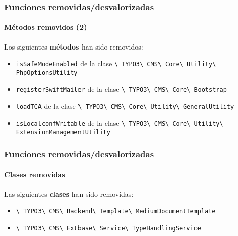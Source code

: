 \begin{frame}[fragile]
	\frametitle{Funciones removidas/desvalorizadas}
	\framesubtitle{Métodos removidos (2)}

	Los siguientes \textbf{métodos} han sido removidos:

	\begin{itemize}

		\item
			\small
				\texttt{isSafeModeEnabled}\newline
				de la clase
				\texttt{\textbackslash
					TYPO3\textbackslash
					CMS\textbackslash
					Core\textbackslash
					Utility\textbackslash
					PhpOptionsUtility}
			\normalsize
		\item
			\small
				\texttt{registerSwiftMailer}\newline
				de la clase
				\texttt{\textbackslash
					TYPO3\textbackslash
					CMS\textbackslash
					Core\textbackslash
					Bootstrap}
			\normalsize
		\item
			\small
				\texttt{loadTCA}\newline
				de la clase
				\texttt{\textbackslash
					TYPO3\textbackslash
					CMS\textbackslash
					Core\textbackslash
					Utility\textbackslash
					GeneralUtility}
			\normalsize
		\item
			\small
				\texttt{isLocalconfWritable}\newline
				de la clase
				\texttt{\textbackslash
					TYPO3\textbackslash
					CMS\textbackslash
					Core\textbackslash
					Utility\textbackslash
					ExtensionManagementUtility}
			\normalsize

	\end{itemize}

\end{frame}


\begin{frame}[fragile]
	\frametitle{Funciones removidas/desvalorizadas}
	\framesubtitle{Clases removidas}

	Las siguientes \textbf{clases} han sido removidas:

	\begin{itemize}

		\item
			\smaller
				\texttt{\textbackslash
					TYPO3\textbackslash
					CMS\textbackslash
					Backend\textbackslash
					Template\textbackslash
					MediumDocumentTemplate}
			\normalsize
		\item
			\smaller
				\texttt{\textbackslash
					TYPO3\textbackslash
					CMS\textbackslash
					Extbase\textbackslash
					Service\textbackslash
					TypeHandlingService}
			\normalsize

	\end{itemize}

\end{frame}

